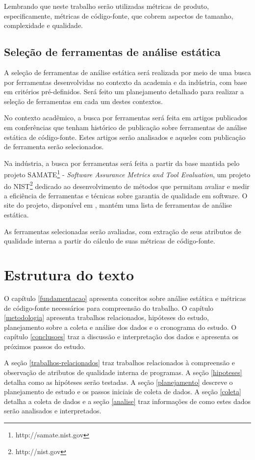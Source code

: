 Lembrando que neste trabalho serão utilizadas métricas de produto,
especificamente, métricas de código-fonte, que cobrem aspectos de tamanho,
complexidade e qualidade.

\subsection{Seleção de ferramentas de análise estática} \label{levantamento}

A seleção de ferramentas de análise estática será realizada por meio de uma
busca por ferramentas desenvolvidas no contexto da academia e da indústria,
com base em critérios pré-definidos. Será feito um planejamento detalhado
para realizar a seleção de ferramentas em cada um destes contextos.

No contexto acadêmico, a busca por ferramentas será feita em artigos
publicados em conferências que tenham histórico de publicação sobre
ferramentas de análise estática de código-fonte.  Estes artigos serão
analisados e aqueles com publicação de ferramenta serão selecionados.

Na indústria, a busca por ferramentas será feita a partir da base mantida pelo
projeto SAMATE\footnote{http://samate.nist.gov} - {\em Software Assurance
Metrics and Tool Evaluation}, um projeto do NIST\footnote{http://nist.gov}
dedicado ao desenvolvimento de métodos que permitam avaliar e medir a
eficiência de ferramentas e técnicas sobre garantia de qualidade em software.
O site do projeto, disponível em , mantém uma lista
de ferramentas de análise estática.

As ferramentas selecionadas serão avaliadas, com extração de
seus atributos de qualidade interna a partir do cálculo de suas métricas de
código-fonte.

\section{Estrutura do texto} 

O capítulo \ref{fundamentacao} apresenta conceitos sobre análise estática e
métricas de código-fonte necessários para compreensão do trabalho. O capítulo
\ref{metodologia} apresenta trabalhos relacionados, hipóteses do estudo,
planejamento sobre a coleta e análise dos dados
e o cronograma do estudo. O capítulo \ref{conclusoes} traz a
discussão e interpretação dos dados e apresenta os próximos passos do estudo.

A seção \ref{trabalhos-relacionados} traz trabalhos relacionados à compreensão
e observação de atributos de qualidade interna de programas. A seção
\ref{hipoteses} detalha como as hipóteses serão testadas. A seção
\ref{planejamento} descreve o planejamento de estudo e os passos iniciais de
coleta de dados. A seção \ref{coleta} detalha a coleta de dados e a seção
\ref{analise} traz informações de como estes dados serão analisados e
interpretados.
